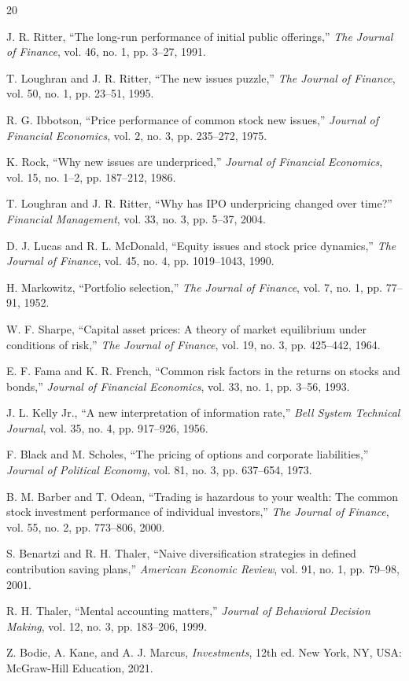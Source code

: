 \documentclass[conference]{IEEEtran}
\begin{document}
\begin{thebibliography}{20}

J. R. Ritter,
``The long-run performance of initial public offerings,''
\textit{The Journal of Finance}, vol. 46, no. 1, pp. 3--27, 1991.

T. Loughran and J. R. Ritter,
``The new issues puzzle,''
\textit{The Journal of Finance}, vol. 50, no. 1, pp. 23--51, 1995.

R. G. Ibbotson,
``Price performance of common stock new issues,''
\textit{Journal of Financial Economics}, vol. 2, no. 3, pp. 235--272, 1975.

K. Rock,
``Why new issues are underpriced,''
\textit{Journal of Financial Economics}, vol. 15, no. 1--2, pp. 187--212, 1986.

T. Loughran and J. R. Ritter,
``Why has IPO underpricing changed over time?''
\textit{Financial Management}, vol. 33, no. 3, pp. 5--37, 2004.

D. J. Lucas and R. L. McDonald,
``Equity issues and stock price dynamics,''
\textit{The Journal of Finance}, vol. 45, no. 4, pp. 1019--1043, 1990.

H. Markowitz,
``Portfolio selection,''
\textit{The Journal of Finance}, vol. 7, no. 1, pp. 77--91, 1952.

W. F. Sharpe,
``Capital asset prices: A theory of market equilibrium under conditions of risk,''
\textit{The Journal of Finance}, vol. 19, no. 3, pp. 425--442, 1964.

E. F. Fama and K. R. French,
``Common risk factors in the returns on stocks and bonds,''
\textit{Journal of Financial Economics}, vol. 33, no. 1, pp. 3--56, 1993.

J. L. Kelly Jr.,
``A new interpretation of information rate,''
\textit{Bell System Technical Journal}, vol. 35, no. 4, pp. 917--926, 1956.

F. Black and M. Scholes,
``The pricing of options and corporate liabilities,''
\textit{Journal of Political Economy}, vol. 81, no. 3, pp. 637--654, 1973.

B. M. Barber and T. Odean,
``Trading is hazardous to your wealth: The common stock investment performance of individual investors,''
\textit{The Journal of Finance}, vol. 55, no. 2, pp. 773--806, 2000.

S. Benartzi and R. H. Thaler,
``Naive diversification strategies in defined contribution saving plans,''
\textit{American Economic Review}, vol. 91, no. 1, pp. 79--98, 2001.

R. H. Thaler,
``Mental accounting matters,''
\textit{Journal of Behavioral Decision Making}, vol. 12, no. 3, pp. 183--206, 1999.

Z. Bodie, A. Kane, and A. J. Marcus,
\textit{Investments}, 12th ed. New York, NY, USA: McGraw-Hill Education, 2021.

\end{thebibliography}
\end{document}

